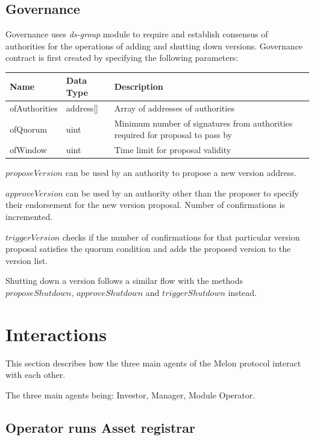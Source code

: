 \documentclass[conference]{IEEEtran}
\begin{document}
\subsection{Governance} \label{component:governance}

Governance uses \textit{ds-group} module to require and establish consensus of authorities for the operations of adding and shutting down versions. Governance contract is first created by specifying the following parameters:

\begin{center}
	\footnotesize
	\begin{tabular}{ | p{2cm} | p{1.2cm} | p{4cm} | }
		\hline
		Name & Data Type & Description \\ \hline
		ofAuthorities & address[] & Array of addresses of authorities \\ \hline
		ofQuorum & uint & Minimum number of signatures from authorities required for proposal to pass by \\ \hline
		ofWindow & uint & Time limit for proposal validity \\ \hline
	\end{tabular}
\end{center}


$proposeVersion$ can be used by an authority to propose a new version address.

$approveVersion$ can be used by an authority other than the proposer to specify their endorsement for the new version proposal.  Number of confirmations is incremented.

$triggerVersion$ checks if the number of confirmations for that particular version proposal satisfies the quorum condition and adds the proposed version to the version list. 

Shutting down a version follows a similar flow with the methods $proposeShutdown$, $approveShutdown$ and $triggerShutdown$ instead.

\section{Interactions}

This section describes how the three main agents of the Melon protocol interact with each other.

The three main agents being: Investor, Manager, Module Operator.

\subsection{Operator runs Asset registrar}
\end{document}
